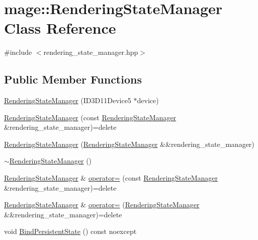 \hypertarget{classmage_1_1_rendering_state_manager}{}\section{mage\+:\+:Rendering\+State\+Manager Class Reference}
\label{classmage_1_1_rendering_state_manager}


{\ttfamily \#include $<$rendering\+\_\+state\+\_\+manager.\+hpp$>$}

\subsection*{Public Member Functions}
\begin{DoxyCompactItemize}
\item 
\hyperlink{classmage_1_1_rendering_state_manager_a7e2ae8265b322b0700fd5ade4b791aea}{Rendering\+State\+Manager} (I\+D3\+D11\+Device5 $\ast$device)
\item 
\hyperlink{classmage_1_1_rendering_state_manager_af73792aa9689050ee050b641ffbefe39}{Rendering\+State\+Manager} (const \hyperlink{classmage_1_1_rendering_state_manager}{Rendering\+State\+Manager} \&rendering\+\_\+state\+\_\+manager)=delete
\item 
\hyperlink{classmage_1_1_rendering_state_manager_a7103afcf92884f7916b7039946c1a605}{Rendering\+State\+Manager} (\hyperlink{classmage_1_1_rendering_state_manager}{Rendering\+State\+Manager} \&\&rendering\+\_\+state\+\_\+manager)
\item 
\hyperlink{classmage_1_1_rendering_state_manager_ad4865219aaaac55dd53c4ab51af8d63f}{$\sim$\+Rendering\+State\+Manager} ()
\item 
\hyperlink{classmage_1_1_rendering_state_manager}{Rendering\+State\+Manager} \& \hyperlink{classmage_1_1_rendering_state_manager_a4f2ee3e88ad79660e867a4a945ebe951}{operator=} (const \hyperlink{classmage_1_1_rendering_state_manager}{Rendering\+State\+Manager} \&rendering\+\_\+state\+\_\+manager)=delete
\item 
\hyperlink{classmage_1_1_rendering_state_manager}{Rendering\+State\+Manager} \& \hyperlink{classmage_1_1_rendering_state_manager_ac8ab6290fb1801ed1acc5b50c8749b6b}{operator=} (\hyperlink{classmage_1_1_rendering_state_manager}{Rendering\+State\+Manager} \&\&rendering\+\_\+state\+\_\+manager)=delete
\item 
void \hyperlink{classmage_1_1_rendering_state_manager_aadbe543fdb458104c42fe9182848805e}{Bind\+Persistent\+State} () const noexcept

\end{DoxyCompactItemize}
